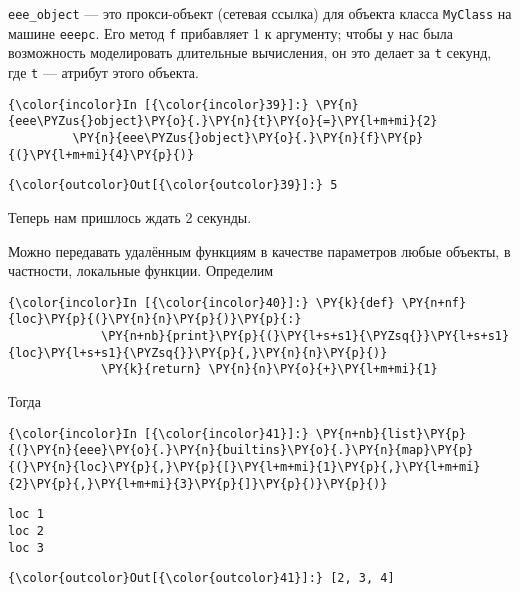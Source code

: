     \texttt{eee\_object} --- это прокси-объект (сетевая ссылка) для объекта
класса \texttt{MyClass} на машине \texttt{eeepc}. Его метод \texttt{f}
прибавляет 1 к аргументу; чтобы у нас была возможность моделировать
длительные вычисления, он это делает за \texttt{t} секунд, где
\texttt{t} --- атрибут этого объекта.

    \begin{Verbatim}[commandchars=\\\{\}]
{\color{incolor}In [{\color{incolor}39}]:} \PY{n}{eee\PYZus{}object}\PY{o}{.}\PY{n}{t}\PY{o}{=}\PY{l+m+mi}{2}
         \PY{n}{eee\PYZus{}object}\PY{o}{.}\PY{n}{f}\PY{p}{(}\PY{l+m+mi}{4}\PY{p}{)}
\end{Verbatim}


\begin{Verbatim}[commandchars=\\\{\}]
{\color{outcolor}Out[{\color{outcolor}39}]:} 5
\end{Verbatim}
            
    Теперь нам пришлось ждать 2 секунды.

Можно передавать удалённым функциям в качестве параметров любые объекты,
в частности, локальные функции. Определим

    \begin{Verbatim}[commandchars=\\\{\}]
{\color{incolor}In [{\color{incolor}40}]:} \PY{k}{def} \PY{n+nf}{loc}\PY{p}{(}\PY{n}{n}\PY{p}{)}\PY{p}{:}
             \PY{n+nb}{print}\PY{p}{(}\PY{l+s+s1}{\PYZsq{}}\PY{l+s+s1}{loc}\PY{l+s+s1}{\PYZsq{}}\PY{p}{,}\PY{n}{n}\PY{p}{)}
             \PY{k}{return} \PY{n}{n}\PY{o}{+}\PY{l+m+mi}{1}
\end{Verbatim}


    Тогда

    \begin{Verbatim}[commandchars=\\\{\}]
{\color{incolor}In [{\color{incolor}41}]:} \PY{n+nb}{list}\PY{p}{(}\PY{n}{eee}\PY{o}{.}\PY{n}{builtins}\PY{o}{.}\PY{n}{map}\PY{p}{(}\PY{n}{loc}\PY{p}{,}\PY{p}{[}\PY{l+m+mi}{1}\PY{p}{,}\PY{l+m+mi}{2}\PY{p}{,}\PY{l+m+mi}{3}\PY{p}{]}\PY{p}{)}\PY{p}{)}
\end{Verbatim}


    \begin{Verbatim}[commandchars=\\\{\}]
loc 1
loc 2
loc 3

    \end{Verbatim}

\begin{Verbatim}[commandchars=\\\{\}]
{\color{outcolor}Out[{\color{outcolor}41}]:} [2, 3, 4]
\end{Verbatim}
            
